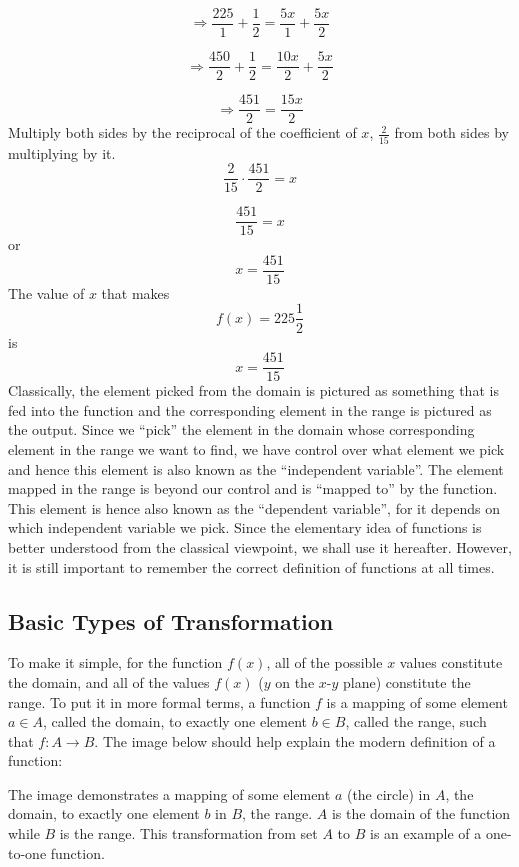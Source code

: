 \[
\Rightarrow \frac{225}{1} + \frac{1}{2} = \frac{5x}{1} + \frac{5x}{2}
\]

\[
\Rightarrow \frac{450}{2} + \frac{1}{2} = \frac{10x}{2} + \frac{5x}{2}
\]

\[
\Rightarrow \frac{451}{2} = \frac{15x}{2}
\]
Multiply both sides by the reciprocal of the coefficient of $x$, $\frac{2}{15}$ from both sides by multiplying by it.
\[
\frac{2}{15} \cdot \frac{451}{2} = x
\]

\[
\frac{451}{15} = x
\]
or
\[
x = \frac{451}{15}
\]
The value of $x$ that makes 
\[
f(x) = 225 \frac{1}{2}
\]
is
\[
x = \frac{451}{15}
\]
Classically, the element picked from the domain is pictured as something that is fed into
the function and the corresponding element in the range is pictured as the output. Since
we ``pick'' the element in the domain whose corresponding element in the range we want to
find, we have control over what element we pick and hence this element is also known as
the ``independent variable''. The element mapped in the range is beyond our control and is
``mapped to'' by the function. This element is hence also known as the ``dependent
variable'', for it depends on which independent variable we pick. Since the elementary
idea of functions is better understood from the classical viewpoint, we shall use it
hereafter. However, it is still important to remember the correct definition of functions
at all times.

\subsection{Basic Types of Transformation}
\label{sss:basi-cd64}

To make it simple, for the function $f(x)$, all of the possible $x$ values constitute the domain, and all of the values $f(x)$ ($y$ on the $x$-$y$ plane) constitute the range. To put it in more formal terms, a function $f$ is a mapping of some element $a \in A$, called the domain, to exactly one element $b \in B$, called the range, such that $f:A \to B$. The image below should help explain the modern definition of a function:

The image demonstrates a mapping of some element $a$ (the circle) in $A$, the domain, to exactly one element $b$ in $B$, the range. $A$ is the domain of the function while $B$ is the range. This transformation from set $A$ to $B$ is an example of a one-to-one function.

